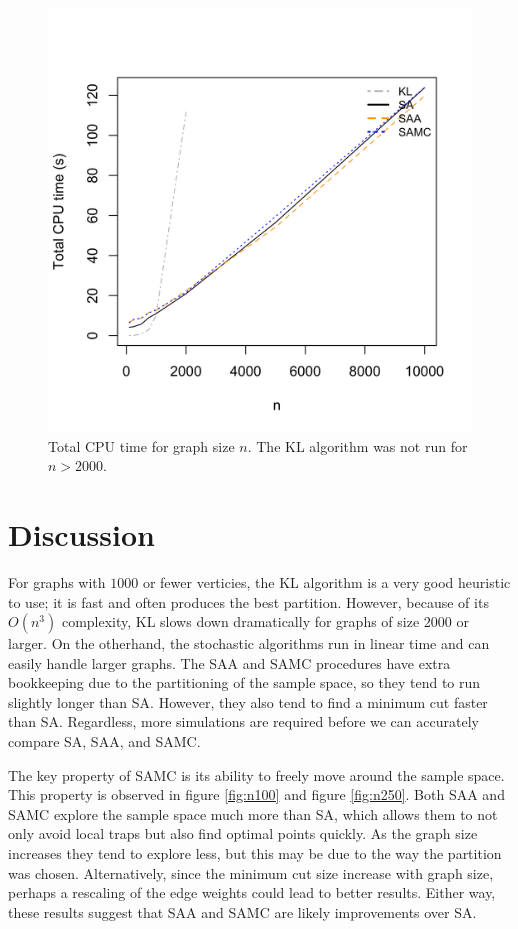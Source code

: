 \documentclass[11pt,]{article}
\begin{document}
\begin{figure}[hbpt]
  \centering
  \includegraphics[width=.65\textwidth]{images/graph_all_times_iter1e+05}
  \caption{Total CPU time for graph size $n$. The KL algorithm was not run for $n > 2000$.}
  \label{fig:alltimes}
\end{figure}

\section{Discussion}\label{discussion}

For graphs with \(1000\) or fewer verticies, the KL algorithm is a very
good heuristic to use; it is fast and often produces the best partition.
However, because of its \(O(n^3)\) complexity, KL slows down
dramatically for graphs of size \(2000\) or larger. On the otherhand,
the stochastic algorithms run in linear time and can easily handle
larger graphs. The SAA and SAMC procedures have extra bookkeeping due to
the partitioning of the sample space, so they tend to run slightly
longer than SA. However, they also tend to find a minimum cut faster
than SA. Regardless, more simulations are required before we can
accurately compare SA, SAA, and SAMC.

The key property of SAMC is its ability to freely move around the sample
space. This property is observed in figure \ref{fig:n100} and figure
\ref{fig:n250}. Both SAA and SAMC explore the sample space much more
than SA, which allows them to not only avoid local traps but also find
optimal points quickly. As the graph size increases they tend to explore
less, but this may be due to the way the partition was chosen.
Alternatively, since the minimum cut size increase with graph size,
perhaps a rescaling of the edge weights could lead to better results.
Either way, these results suggest that SAA and SAMC are likely
improvements over SA.
\end{document}

